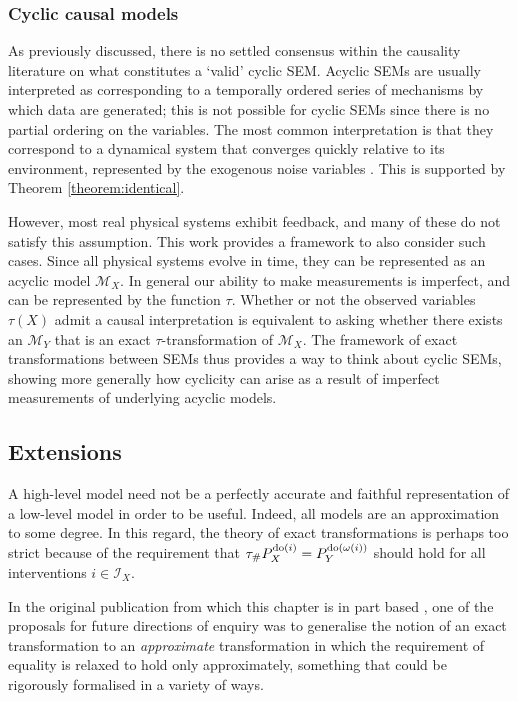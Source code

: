 \subsubsection{Cyclic causal models}

As previously discussed, there is no settled consensus within the causality literature on what constitutes a `valid' cyclic SEM.
Acyclic SEMs are usually interpreted as corresponding to a temporally ordered series of mechanisms by which data are generated; this is not possible for cyclic SEMs since there is no partial ordering on the variables.
The most common interpretation is that they correspond to a dynamical system that converges quickly relative to its environment, represented by the exogenous noise variables \citep{mooij2013ode}.
This is supported by Theorem \ref{theorem:identical}.

However, most real physical systems exhibit feedback, and many of these do not satisfy this assumption. This work provides a framework to also consider such cases.
Since all physical systems evolve in time, they can be represented as an acyclic model $\mathcal{M}_X$.
In general our ability to make measurements is imperfect, and can be represented by the function $\tau$. 
Whether or not the observed variables $\tau(X)$ admit a causal interpretation is equivalent to asking whether there exists an $\mathcal{M}_Y$ that is an exact $\tau$-transformation of $\mathcal{M}_X$.
The framework of exact transformations between SEMs thus provides a way to think about cyclic SEMs, showing more generally how cyclicity can arise as a result of imperfect measurements of underlying acyclic models.

\subsection{Extensions}

A high-level model need not be a perfectly accurate and faithful representation of a low-level model in order to be useful. 
Indeed, all models are an approximation to some degree.
In this regard, the theory of exact transformations is perhaps too strict because of the requirement that $\tau_{\#}P_X^{\operatorname{do}(i)} = P_Y^{\operatorname{do}(\omega(i))}$ should hold for all interventions $i\in \mathcal{I}_X$.

In the original publication from which this chapter is in part based \citep{rubenstein2017causal}, one of the proposals for future directions of enquiry was to generalise the notion of an exact transformation to an \emph{approximate} transformation in which the requirement of equality is relaxed to hold only approximately, something that could be rigorously formalised in a variety of ways.


